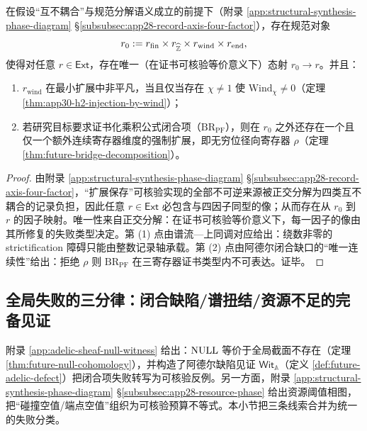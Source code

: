 \begin{theorem}[记录轴初对象与最小性分层]\label{thm:app30-initial-record-axis}
在假设“互不耦合”与规范分解语义成立的前提下（附录 \ref{app:structural-synthesis-phase-diagram} \S\ref{subsubsec:app28-record-axis-four-factor}），存在规范对象
$$
r_0:=r_{\mathrm{fin}}\times r_{\widehat{\mathbb{Z}}}\times r_{\mathrm{wind}}\times r_{\mathrm{end}},
$$
使得对任意 $r\in\mathsf{Ext}$，存在唯一（在证书可核验等价意义下）态射 $r_0\to r$。并且：
\begin{enumerate}
  \item $r_{\mathrm{wind}}$ 在最小扩展中非平凡，当且仅当存在 $\chi\neq 1$ 使 $\mathrm{Wind}_\chi\neq 0$（定理 \ref{thm:app30-h2-injection-by-wind}）；
  \item 若研究目标要求证书化乘积公式闭合项（$\mathrm{BR}_{\mathrm{PF}}$），则在 $r_0$ 之外还存在一个且仅一个额外连续寄存器维度的强制扩展，即无穷位径向寄存器 $\rho$（定理 \ref{thm:future-bridge-decomposition}）。
\end{enumerate}
\end{theorem}

\begin{proof}
由附录 \ref{app:structural-synthesis-phase-diagram} \S\ref{subsubsec:app28-record-axis-four-factor}，“扩展保存”可核验实现的全部不可逆来源被正交分解为四类互不耦合的记录负担，因此任意 $r\in\mathsf{Ext}$ 必包含与四因子同型的像；从而存在从 $r_0$ 到 $r$ 的因子映射。唯一性来自正交分解：在证书可核验等价意义下，每一因子的像由其所修复的失败类型决定。第 (1) 点由谱流—上同调对应给出：绕数非零的 strictification 障碍只能由整数记录轴承载。第 (2) 点由阿德尔闭合缺口的“唯一连续性”给出：拒绝 $\rho$ 则 $\mathrm{BR}_{\mathrm{PF}}$ 在三寄存器证书类型内不可表达。证毕。
\end{proof}

\subsection{全局失败的三分律：闭合缺陷/谱扭结/资源不足的完备见证}\label{subsec:app30-null-trichotomy}

附录 \ref{app:adelic-sheaf-null-witness} 给出：$\mathrm{NULL}$ 等价于全局截面不存在（定理 \ref{thm:future-null-cohomology}），并构造了阿德尔缺陷见证 $\mathsf{Wit}_{\mathbb{A}}$（定义 \ref{def:future-adelic-defect}）把闭合项失败转写为可核验反例。另一方面，附录 \ref{app:structural-synthesis-phase-diagram} \S\ref{subsubsec:app28-resource-phase} 给出资源阈值相图，把“碰撞空值/端点空值”组织为可核验预算不等式。本小节把三条线索合并为统一的失败分类。

